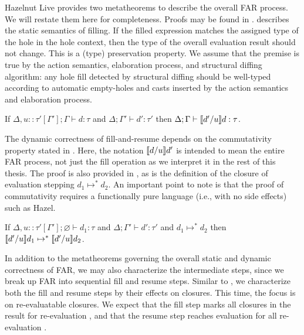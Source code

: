 Hazelnut Live provides two metatheorems to describe the overall FAR process. We will restate them here for completeness. Proofs may be found in \cite{conf/popl/HazelnutLive19}.  describes the static semantics of filling. If the filled expression matches the assigned type of the hole in the hole context, then the type of the overall evaluation result should not change. This is a (type) preservation property. We assume that the premise is true by the action semantics, elaboration process, and structural diffing algorithm: any hole fill detected by structural diffing should be well-typed according to automatic empty-holes and casts inserted by the action semantics and elaboration process.

\begin{theorem}
  If $\Delta,u::\tau'[\Gamma'];\Gamma\vdash d:\tau$ and $\Delta;\Gamma'\vdash d':\tau'$ then $\Delta;\Gamma\vdash\llbracket{}d'/u\rrbracket{}d:\tau$.
  \label{thm:filling-statics}
\end{theorem}

The dynamic correctness of fill-and-resume depends on the commutativity property stated in . Here, the notation $\llbracket{}d/u\rrbracket{}d'$ is intended to mean the entire FAR process, not just the fill operation as we interpret it in the rest of this thesis. The proof is also provided in \cite{conf/popl/HazelnutLive19}, as is the definition of the closure of evaluation stepping $d_1\mapsto^*d_2$. An important point to note is that the proof of commutativity requires a functionally pure language (i.e., with no side effects) such as Hazel.

\begin{theorem}
  If $\Delta,u::\tau'[\Gamma'];\varnothing\vdash d_1:\tau$ and $\Delta;\Gamma'\vdash d':\tau'$ and $d_1\mapsto^* d_2$ then $\llbracket{}d'/u\rrbracket{}d_1\mapsto^*\llbracket{}d'/u\rrbracket{}d_2$.
  \label{thm:commutativity}
\end{theorem}

In addition to the metatheorems governing the overall static and dynamic correctness of FAR, we may also characterize the intermediate steps, since we break up FAR into sequential fill and resume steps. Similar to , we characterize both the fill and resume steps by their effects on closures. This time, the focus is on re-evaluatable closures. We expect that the fill step marks all closures in the result for re-evaluation , and that the resume step reaches evaluation for all re-evaluation .

